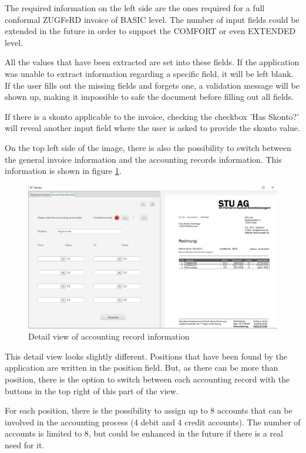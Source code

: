 The required information on the left side are the ones required for a full conformal ZUGFeRD invoice of BASIC level. The number of input fields could be extended in the future in order to support the COMFORT or even EXTENDED level.

All the values that have been extracted are set into these fields. If the application was unable to extract information regarding a specific field, it will be left blank. If the user fills out the missing fields and forgets one, a validation message will be shown up, making it impossible to safe the document before filling out all fields.

If there is a skonto applicable to the invoice, checking the checkbox 'Has Skonto?' will reveal another input field where the user is asked to provide the skonto value.

On the top left side of the image, there is also the possibility to switch between the general invoice information and the accounting records information. This information is shown in figure \ref{reviewAR}.

\begin{figure}[ht!]
\centering
\includegraphics[width=\textwidth,natwidth=429,natheight=247]{Images/GUI/reviewAR.pdf}
\caption{Detail view of accounting record information \label{reviewAR}}
\end{figure}

This detail view looks slightly different. Positions that have been found by the application are written in the position field. But, as there can be more than position, there is the option to switch between each accounting record with the buttons in the top right of this part of the view.

For each position, there is the possibility to assign up to 8 accounts that can be involved in the accounting process (4 debit and 4 credit accounts). The number of accounts is limited to 8, but could be enhanced in the future if there is a real need for it.

